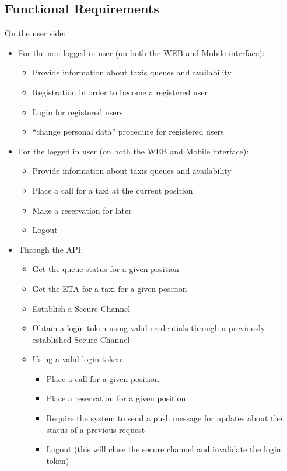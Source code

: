 \documentclass{article}
\begin{document}
\subsection{Functional Requirements}
On the user side:\@
\begin{itemize}
	\item For the non logged in user (on both the WEB and Mobile interface):
		\begin{itemize}
			\item Provide information about taxis queues and availability 
			\item Registration in order to become a registered user
			\item Login for registered users
			\item ``change personal data'' procedure for registered users
		\end{itemize}
	\item For the logged in user (on both the WEB and Mobile interface):
		\begin{itemize}
			\item Provide information about taxis queues and availability 
			\item Place a call for a taxi at the current position 
			\item Make a reservation for later
			\item Logout
		\end{itemize}
	\item Through the API:\@
		\begin{itemize}
			\item Get the queue status for a given position
			\item Get the ETA for a taxi for a given position
			\item Establish a Secure Channel 
			\item Obtain a login-token using valid credentials through a previously established Secure Channel
			\item Using a valid login-token:\@
				\begin{itemize}
					\item Place a call for a given position
					\item Place a reservation for a given position
					\item Require the system to send a push message for updates about the status of a previous request
					\item Logout (this will close the secure channel and invalidate the login token) 
				\end{itemize}
		\end{itemize}
\end{itemize}
\end{document}
